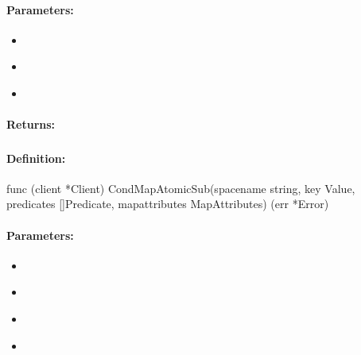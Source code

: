 \paragraph{Parameters:}
\begin{itemize}[noitemsep]
\item {}\\

\item {}\\

\item {}\\

\end{itemize}

\paragraph{Returns:}


\pagebreak
\subsubsection{}
\label{api:Go:CondMapAtomicSub}


\paragraph{Definition:}
\begin{gocode}
func (client *Client) CondMapAtomicSub(spacename string, key Value, predicates []Predicate, mapattributes MapAttributes) (err *Error)
\end{gocode}

\paragraph{Parameters:}
\begin{itemize}[noitemsep]
\item {}\\

\item {}\\

\item {}\\

\item {}\\

\end{itemize}

